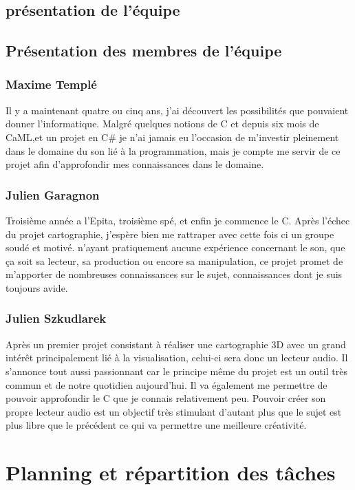 \documentclass{report}
\begin{document}
\newpage

\section{présentation de l'équipe}
\section{Présentation des membres de l'équipe}
		\subsection{Maxime Templé}

Il y a maintenant quatre ou cinq ans, j'ai découvert les possibilités que pouvaient donner l'informatique. Malgré quelques notions de C et depuis six mois de CaML,et un projet en C\# je n'ai jamais eu l'occasion de m'investir pleinement dans le domaine du son lié à la programmation, mais je compte me servir de ce projet afin d'approfondir mes connaissances dans le domaine.

		\subsection{Julien Garagnon}

Troisième année a l'Epita, troisième spé, et enfin je commence le C. Après l'échec du projet cartographie, j'espère bien me rattraper avec cette fois ci un groupe soudé et motivé. n'ayant pratiquement aucune expérience concernant le son, que ça soit sa lecteur, sa production ou encore sa manipulation, ce projet promet de m'apporter de nombreuses connaissances sur le sujet, connaissances dont je suis toujours avide.

		\subsection{Julien Szkudlarek}
		Après un premier projet consistant à réaliser une cartographie 3D avec un grand intérêt principalement lié à la visualisation, celui-ci sera donc un lecteur audio. Il s'annonce tout aussi passionnant car le principe même du projet est un outil très commun et de notre quotidien aujourd'hui. Il va également me permettre de pouvoir approfondir le C que je connais relativement peu. Pouvoir créer son propre lecteur audio est un objectif très stimulant d'autant plus que le sujet est plus libre que le précédent ce qui va permettre une meilleure créativité.
\newpage


\chapter{Planning et répartition des tâches}
\end{document}
